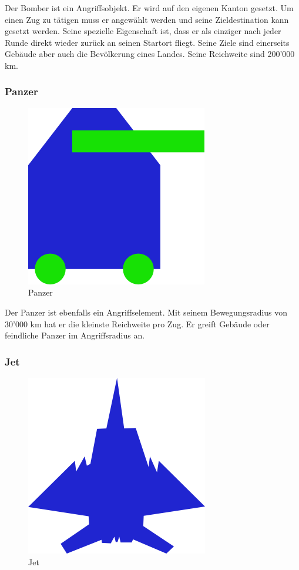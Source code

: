 \documentclass[ngerman, 12pt, pdftex]{scrartcl}[2006/07/30]
\begin{document}
Der Bomber ist ein Angriffsobjekt.
Er wird auf den eigenen Kanton gesetzt. Um einen Zug zu tätigen muss er angewählt werden und seine Zieldestination kann gesetzt werden. Seine spezielle Eigenschaft ist, dass er als einziger nach jeder Runde direkt wieder zurück an seinen Startort fliegt.
Seine Ziele sind einerseits Gebäude aber auch die Bevölkerung eines Landes. Seine Reichweite sind 200'000 km.

\newpage

\subsubsection{Panzer}

\begin{figure}[h]
\centering
\includegraphics[scale=1.8]{einheiten/Panzer.png}
\caption{Panzer}
\end{figure}

Der Panzer ist ebenfalls ein Angriffselement.
Mit seinem Bewegungsradius von 30'000 km hat er die kleinste Reichweite pro Zug. Er greift Gebäude oder feindliche Panzer im Angriffsradius an.


\subsubsection{Jet}

\begin{figure}[h]
\centering
\includegraphics[scale=1.8]{einheiten/Flugzeug.png}
\caption{Jet}
\end{figure}
\end{document}
